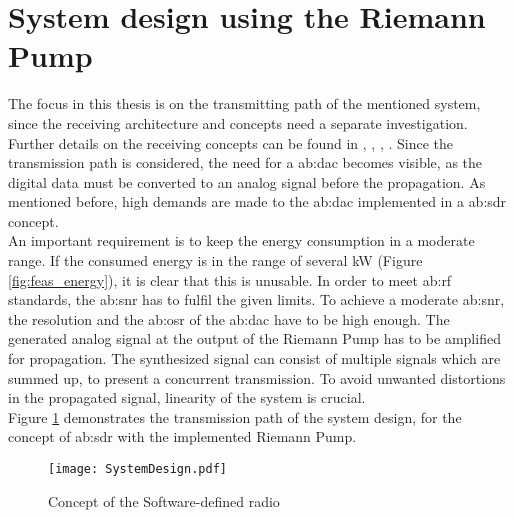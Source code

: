 \section{System design using the Riemann Pump} %
The focus in this thesis is on the transmitting path of the mentioned system, since the receiving architecture and concepts need a separate investigation.
Further details on the receiving concepts can be found in  \cite{RivetDevalBegueretJ.-B.2007}, \cite{RivetFadhuileDevalEtAl2013}, \cite{RivetDevalD.2008}, \cite{RivetF.2014}.
Since the transmission path is considered, the need for a \gls{ab:dac} becomes visible, as the digital data must be converted to an analog signal before the propagation.
As mentioned before, high demands are made to the \gls{ab:dac} implemented in a \gls{ab:sdr} concept.\\
An important requirement is to keep the energy consumption in a moderate range.
If the consumed energy is in the range of several \si{\kilo \watt} (Figure \ref{fig:feas_energy}), it is clear that this is unusable.
In order to meet \gls{ab:rf} standards, the \gls{ab:snr} has to fulfil the given limits. %
To achieve a moderate \gls{ab:snr}, the resolution and the \gls{ab:osr} of the \gls{ab:dac} have to be high enough.
The generated analog signal at the output of the Riemann Pump has to be amplified for propagation.
The synthesized signal can consist of multiple signals which are summed up, to present a concurrent transmission.
To avoid unwanted distortions in the propagated signal, linearity of the system is crucial.\\
Figure \ref{fig:System} demonstrates the transmission path of the system design, for the concept of \gls{ab:sdr} with the implemented Riemann Pump.

\begin{figure}[ht]
	\centering
  \texttt{[image: SystemDesign.pdf]}
	\caption{Concept of the Software-defined radio}
	\label{fig:System}
\end{figure}


